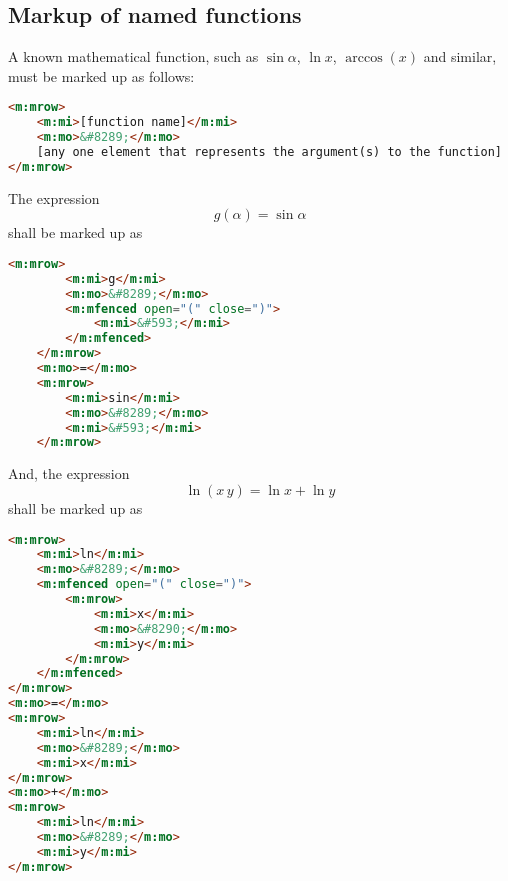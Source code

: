 \documentclass[english,a4paper,11pt]{article}
\begin{document}
\subsection{Markup of named functions}\label{named-functions}
A known mathematical function, such as $\sin \alpha$, $\ln x$, $\arccos(x)$ and similar, must be marked up as follows:
\begin{lstlisting}[language=HTML]
<m:mrow>
	<m:mi>[function name]</m:mi>
	<m:mo>&#8289;</m:mo>
	[any one element that represents the argument(s) to the function]
</m:mrow>
\end{lstlisting}


\begin{eksempler}
	The expression 
	\begin{equation}g(\alpha) = \sin \alpha\end{equation}
	shall be marked up as
	\begin{lstlisting}[language=HTML]
	<m:mrow>
		<m:mi>g</m:mi>
		<m:mo>&#8289;</m:mo>
		<m:mfenced open="(" close=")">
			<m:mi>&#593;</m:mi>
		</m:mfenced>
	</m:mrow>
	<m:mo>=</m:mo>
	<m:mrow>
		<m:mi>sin</m:mi>
		<m:mo>&#8289;</m:mo>
		<m:mi>&#593;</m:mi>
	</m:mrow>
	\end{lstlisting}

And, the expression 
\begin{equation}
\ln (x\, y) = \ln x + \ln y
\end{equation}
shall be marked up as
\begin{lstlisting}[language=HTML]
<m:mrow>
	<m:mi>ln</m:mi>
	<m:mo>&#8289;</m:mo>
	<m:mfenced open="(" close=")">
		<m:mrow>
			<m:mi>x</m:mi>
			<m:mo>&#8290;</m:mo>
			<m:mi>y</m:mi>
		</m:mrow>
	</m:mfenced>
</m:mrow>
<m:mo>=</m:mo>
<m:mrow>
	<m:mi>ln</m:mi>
	<m:mo>&#8289;</m:mo>
	<m:mi>x</m:mi>
</m:mrow>
<m:mo>+</m:mo>
<m:mrow>
	<m:mi>ln</m:mi>
	<m:mo>&#8289;</m:mo>
	<m:mi>y</m:mi>
</m:mrow>
\end{lstlisting}
\end{eksempler}
\end{document}
